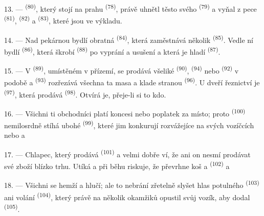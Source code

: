 13. ---  \textsuperscript{(80)}, který stojí na prahu 
\textsuperscript{(78)}, právě uhnětl těsto svého  \textsuperscript{(79)}
a vyňal z pece  \textsuperscript{(81)}, 
\textsuperscript{(82)} a  \textsuperscript{(83)}, které jsou ve
výkladu.

14. --- Nad pekárnou bydlí obratná  \textsuperscript{(84)},
která zaměstnává několik  \textsuperscript{(85)}. Vedle ní bydlí
 \textsuperscript{(86)}, která škrobí 
\textsuperscript{(88)} po vyprání a usušení a která je hladí 
\textsuperscript{(87)}.

\VUsaut{4.0mm}
\VUsaut{3.0mm}

15. --- V  \textsuperscript{(89)}, umístěném v přízemí, se prodává
všeliké  \textsuperscript{(90)}, 
\textsuperscript{(94)} nebo  \textsuperscript{(92)} v podobě
 a  
\textsuperscript{(93)} rozřezává všechna ta masa a klade stranou  \textsuperscript{(96)}. U dveří řeznictví je 
\textsuperscript{(97)}, která prodává  \textsuperscript{(98)}. Otvírá
je, přeje-li si to kdo.

16. --- Všichni ti obchodníci platí koncesi nebo poplatek za místo; proto
 \textsuperscript{(100)} nemilosrdně stíhá ubohé  \textsuperscript{(99)}, které jim konkurují rozvážejíce na svých
vozíčcích  nebo  a 

\VUsaut{4.0mm}
\VUsaut{3.0mm}

17. --- Chlapec, který prodává  \textsuperscript{(101)} a
 velmi dobře ví, že ani on nesmí prodávat své zboží blízko trhu. Utíká
a při běhu riskuje, že převrhne koš   a 
 \textsuperscript{(102)}  a 

18. --- Všichni se hemží a hlučí; ale to nebrání zřetelně slyšet hlas potulného
 \textsuperscript{(103)} ani volání 
\textsuperscript{(104)}, který právě na několik okamžiků opustil svůj vozík, aby dodal
 \textsuperscript{(105)}.
